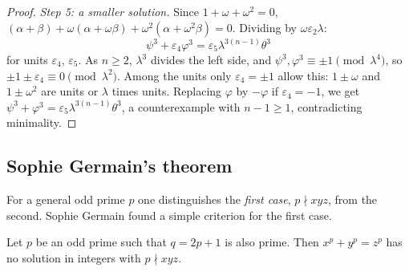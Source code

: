 \begin{proof}
\emph{Step 5: a smaller solution.} Since $1 + \omega + \omega^2 = 0$, $(\alpha + \beta) + \omega(\alpha + \omega\beta) + \omega^2(\alpha + \omega^2\beta) = 0$. Dividing by $\omega\varepsilon_2\lambda$:
\[
\psi^3 + \varepsilon_4\varphi^3 = \varepsilon_5\lambda^{3(n - 1)}\theta^3
\]
for units $\varepsilon_4$, $\varepsilon_5$. As $n \geq 2$, $\lambda^3$ divides the left side, and $\psi^3, \varphi^3 \equiv \pm1 \pmod{\lambda^4}$, so $\pm1 \pm \varepsilon_4 \equiv 0 \pmod{\lambda^2}$. Among the
units only $\varepsilon_4 = \pm1$ allow this: $1 \pm \omega$ and $1 \pm \omega^2$ are units or $\lambda$ times units. Replacing $\varphi$ by $-\varphi$ if $\varepsilon_4 = -1$, we get
$\psi^3 + \varphi^3 = \varepsilon_5\lambda^{3(n - 1)}\theta^3$, a counterexample with $n - 1 \geq 1$, contradicting minimality.
\end{proof}

\subsection{Sophie Germain's theorem}\label{diophantine-equations:subsection-germain}

For a general odd prime $p$ one distinguishes the \emph{first case}, $p \nmid xyz$, from the second. Sophie Germain found a simple criterion for the first case.

\begin{theorem}\label{diophantine-equations:theorem-germain}
Let $p$ be an odd prime such that $q = 2p + 1$ is also prime. Then $x^p + y^p = z^p$ has no solution in integers with $p \nmid xyz$.
\end{theorem}

